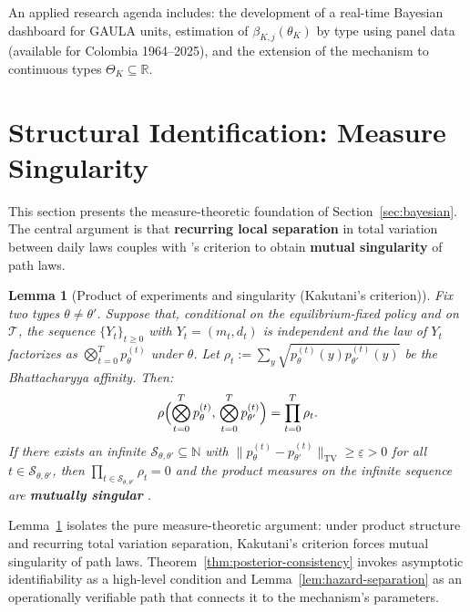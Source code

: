 \documentclass[12pt]{article}
\newtheorem{lemma}[theorem]{Lemma}
\theoremstyle{definition}
\theoremstyle{remark}
\newcommand{\1}{\mathbf{1}}
\begin{document}
An applied research agenda includes: the development of a real-time Bayesian dashboard for GAULA units, estimation of $\beta_{K,j}(\theta_K)$ by type using panel data (available for Colombia 1964--2025), and the extension of the mechanism to continuous types $\Theta_K\subseteq\mathbb{R}$.

\section{Structural Identification: Measure Singularity}
\label{sec:structural-id}

\noindent This section presents the measure-theoretic foundation of Section~\ref{sec:bayesian}. The central argument is that \textbf{recurring local separation} in total variation between daily laws couples with \textcite{Kakutani1948}'s criterion to obtain \textbf{mutual singularity} of path laws.

\begin{lemma}[Product of experiments and singularity (Kakutani's criterion)]
\label{lem:general-id}
Fix two types $\theta\neq\theta'$. Suppose that, conditional on the equilibrium-fixed policy and on $\mathcal{T}$, the sequence $\{Y_t\}_{t\ge 0}$ with $Y_t=(m_t,d_t)$ is independent and the law of $Y_t$ factorizes as $\bigotimes_{t=0}^{T} p_\theta^{(t)}$ under $\theta$. Let $\rho_t:=\sum_y \sqrt{p_\theta^{(t)}(y)p_{\theta'}^{(t)}(y)}$ be the Bhattacharyya affinity. Then:
\[
\rho\Bigl(\bigotimes_{t=0}^{T} p_\theta^{(t)},\,\bigotimes_{t=0}^{T} p_{\theta'}^{(t)}\Bigr)=\prod_{t=0}^{T}\rho_t.
\]
If there exists an infinite $\mathcal{S}_{\theta,\theta'}\subseteq\mathbb{N}$ with $\|p_\theta^{(t)}-p_{\theta'}^{(t)}\|_{\mathrm{TV}}\ge \underline{\varepsilon}>0$ for all $t\in\mathcal{S}_{\theta,\theta'}$, then $\prod_{t\in\mathcal{S}_{\theta,\theta'}}\rho_t=0$ and the product measures on the infinite sequence are \textbf{mutually singular} \parencite{Kakutani1948,Shiryaev2019Probability}.
\end{lemma}

Lemma~\ref{lem:general-id} isolates the pure measure-theoretic argument: under product structure and recurring total variation separation, Kakutani's criterion forces mutual singularity of path laws. Theorem~\ref{thm:posterior-consistency} invokes asymptotic identifiability as a high-level condition and Lemma~\ref{lem:hazard-separation} as an operationally verifiable path that connects it to the mechanism's parameters.
\end{document}
